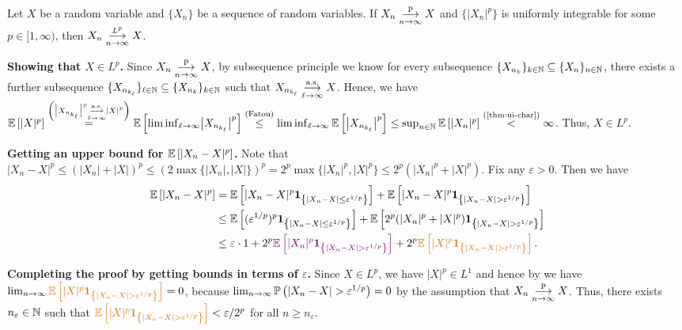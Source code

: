 \begin{enumerate}
\begin{theorem}
\label{thm:conv-ip-ui-imply-lp}
Let \(X\) be a random variable and \(\{X_n\}\) be a sequence of random
variables. If \(X_n\underset{n\to\infty}{\overset{\text{p}}{\longrightarrow}} X\) and \(\{|X_n|^{p}\}\) is uniformly integrable for
some \(p\in [1,\infty)\), then \(X_n\underset{n\to\infty}{\overset{L^p}{\longrightarrow}} X\).
\end{theorem}
\begin{pf}
\textbf{Showing that \(X\in L^p\).}
Since \(X_n\underset{n\to\infty}{\overset{\text{p}}{\longrightarrow}} X\), by subsequence principle we know for every subsequence
\(\{X_{n_{k}}\}_{k\in\mathbb{N}}\subseteq \{X_n\}_{n\in\mathbb{N}}\), there
exists a further subsequence \(\{X_{n_{k_{\ell}}}\}_{\ell\in\mathbb{N}}\subseteq
\{X_{n_{k}}\}_{k\in\mathbb{N}}\) such that
\(X_{n_{k_{\ell}}}\underset{\ell\to\infty}{\overset{\text{a.s.}}{\longrightarrow}}X\).
Hence, we have \(\expv{|X|^{p}}
\overset{\left(\vc{\bigl|}X_{n_{k_{\ell}}}\vc{\bigr|^{p}}\tox{\ell}{\text{a.s.}}
\vc{|}X\vc{|^{p}}\right)}{=}
\expv{\liminf_{\ell\to \infty}\bigl|X_{n_{k_{\ell}}}\bigr|^{p}}
\overset{\text{(Fatou)}}{\le}\liminf_{\ell\to \infty}
\expv{\bigl|X_{n_{k_{\ell}}}\bigr|^{p}}
\le\sup_{n\in\N}\expv{|X_n|^{p}}\overset{\text{(\Cref{thm:ui-char})}}{<}\infty\).
Thus, \(X\in L^p\).

\textbf{Getting an upper bound for \(\mathbb{E}\left[|X_n-X|^{p}\right]\).}
Note that \(|X_n-X|^{p}\le (|X_n|+|X|)^{p}
\le (2\max\{|X_n|,|X|\})^{p}=2^{p}\max\{|X_n|^{p},|X|^{p}\}\le
2^p(|X_n|^{p}+|X|^{p})\). Fix any \(\varepsilon>0\). Then we have
\begin{align*}
\expv{|X_n-X|^{p}}
&=\expv{|X_n-X|^{p}\indicset{|X_n-X|\le\varepsilon^{1/p}}}
+\expv{|X_n-X|^{p}\indicset{|X_n-X|>\varepsilon^{1/p}}} \\
&\le \expv{(\varepsilon^{1/p})^{p}\indicset{|X_n-X|\le\varepsilon^{1/p}}}
+\expv{2^p(|X_n|^{p}+|X|^{p})\indicset{|X_n-X|>\varepsilon^{1/p}}} \\
&\le \varepsilon\cdot 1
+2^{p}\vc{\expv{|X_n|^{p}\indicset{|X_n-X|>\varepsilon^{1/p}}}}
+2^{p}\orc{\expv{|X|^{p}\indicset{|X_n-X|>\varepsilon^{1/p}}}}.
\end{align*}

\textbf{Completing the proof by getting bounds in terms of \(\varepsilon\).}
Since \(X\in L^p\), we have \(|X|^{p}\in L^1\) and hence by
 we have
\(\lim_{n\to\infty}\orc{\expv{|X|^{p}\indicset{|X_n-X|>\varepsilon^{1/p}}}}=0\),
because \(\lim_{n\to\infty}\prob{|X_n-X|>\varepsilon^{1/p}}=0\) by the
assumption that \(X_n\underset{n\to\infty}{\overset{\text{p}}{\longrightarrow}} X\). Thus, there exists \(n_{\varepsilon}\in\mathbb{N}\)
such that \(\orc{\expv{|X|^{p}\indicset{|X_n-X|>\varepsilon^{1/p}}}}<\varepsilon/2^p\)
for all \(n\ge n_{\varepsilon}\).


\end{pf}
\end{enumerate}
